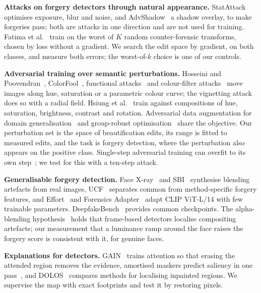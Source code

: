 \textbf{Attacks on forgery detectors through natural appearance.} StatAttack~\cite{statattack2023} optimises exposure, blur
and noise, and AdvShadow~\cite{advshadow2024} a shadow overlay, to make forgeries pass; both are attacks in one direction
and are not used for training. Fatima et al.~\cite{fatima2025} train on the worst of $K$ random counter-forensic
transforms, chosen by loss without a gradient. We search the edit space by gradient, on both classes, and measure both
errors; the worst-of-$k$ choice is one of our controls.

\textbf{Adversarial training over semantic perturbations.} Hosseini and Poovendran~\cite{hosseini2018}, ColorFool~\cite{colorfool2020},
functional attacks~\cite{laidlaw2019} and colour-filter attacks~\cite{ace2020,advcf2023} move images along hue, saturation
or a parametric colour curve; the vignetting attack~\cite{ava2021} does so with a radial field. Hsiung et al.~\cite{gat2023}
train against compositions of hue, saturation, brightness, contrast and rotation. Adversarial data augmentation for domain
generalisation~\cite{volpi2018} and group-robust optimisation~\cite{sagawa2020} share the objective. Our perturbation set is
the space of beautification edits, its range is fitted to measured edits, and the task is forgery detection, where the
perturbation also appears on the positive class. Single-step adversarial training can overfit to its own step~\cite{wong2020fast};
we test for this with a ten-step attack.

\textbf{Generalisable forgery detection.} Face X-ray~\cite{facexray} and SBI~\cite{sbi} synthesise blending artefacts from
real images, UCF~\cite{ucf} separates common from method-specific forgery features, and Effort~\cite{effort} and Forensics
Adapter~\cite{forensicsadapter} adapt CLIP ViT-L/14 with few trainable parameters. DeepfakeBench~\cite{deepfakebench}
provides common checkpoints. The alpha-blending hypothesis~\cite{alphablend2026} holds that frame-based detectors localise
compositing artefacts; our measurement that a luminance ramp around the face raises the forgery score is consistent with
it, for genuine faces.

\textbf{Explanations for detectors.} GAIN~\cite{gain} trains attention so that erasing the attended region removes the
evidence, amortised maskers predict saliency in one pass~\cite{dabkowski2017,phang2020}, and DOLOS~\cite{dolos} compares
methods for localising inpainted regions. We supervise the map with exact footprints and test it by restoring pixels.

